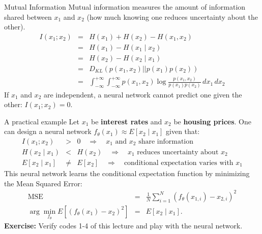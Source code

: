 \documentclass{beamer}
\begin{document}
\begin{frame}{Mutual Information}
Mutual information measures the amount of information shared between $x_1$ and $x_2$ (how much knowing one reduces uncertainty about the other).
\begin{eqnarray*}
I(x_1;x_2) &=& H(x_1) + H(x_2) - H(x_1,x_2) \\
&=& H(x_1) - H(x_1\mid x_2) \\
&=& H(x_2) - H(x_2\mid x_1) \\
&=& D_{KL}(p(x_1,x_2)||p(x_1)p(x_2)) \\
&=& \int_{-\infty}^{+\infty} \int_{-\infty}^{+\infty} p(x_1,x_2) \log\frac{p(x_1,x_2)}{p(x_1)p(x_2)} \, dx_1 \, dx_2
\end{eqnarray*}
If $x_1$ and $x_2$ are independent, a \alert{neural network} cannot predict one given the other: $I(x_1;x_2)=0$.
\end{frame}

\begin{frame}{A practical example}
Let $x_1$ be \textbf{interest rates} and $x_2$ be \textbf{housing
 prices}. One can design a neural network $f_\theta(x_1) \approx
E[x_2\mid x_1]$ given that:
\begin{eqnarray*}
 I(x_1;x_2) & > & 0 \quad \Rightarrow \quad \text{$x_1$ and $x_2$ share information} \\
 H(x_2\mid x_1) & < & H(x_2) \quad \Rightarrow \quad \text{$x_1$ reduces uncertainty about $x_2$} \\
 E[x_2\mid x_1] & \neq & E[x_2] \quad \Rightarrow \quad \text{conditional expectation varies with $x_1$}
\end{eqnarray*}\pause
This neural network learns the conditional expectation function by minimizing the Mean Squared Error:
\begin{eqnarray*}
\text{MSE} & = & \frac{1}{N} \sum_{i=1}^{N} (f_\theta(x_{1,i}) - x_{2,i})^2 \\
\arg\min_{f_\theta} E[(f_{\theta}(x_1) - x_2)^2] &=& E[x_2\mid x_1].
\end{eqnarray*}
\textbf{Exercise:} Verify codes 1-4 of this lecture and
play with the neural network.
\end{frame}
\end{document}
